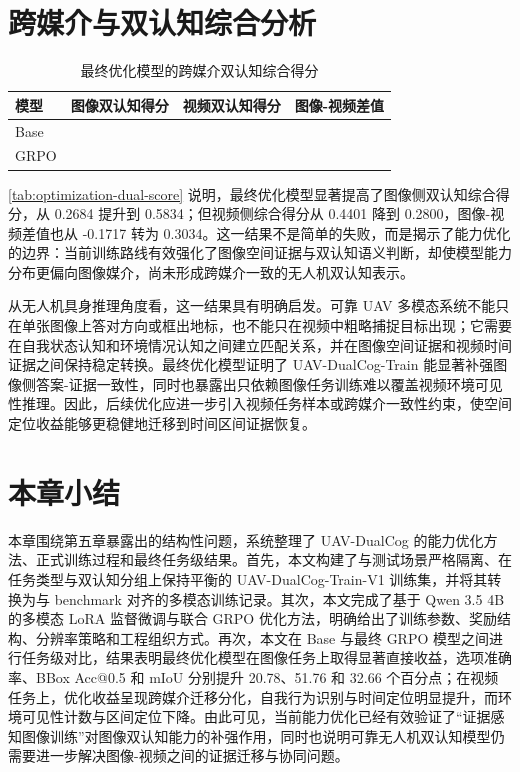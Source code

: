 \section{跨媒介与双认知综合分析}

\begin{table}[htbp]
    \centering
    \caption{最终优化模型的跨媒介双认知综合得分}
    \label{tab:optimization-dual-score}
    \small
    \begin{tabularx}{0.78\textwidth}{@{}X>{\centering\arraybackslash}p{2.3cm}>{\centering\arraybackslash}p{2.3cm}>{\centering\arraybackslash}p{2.3cm}@{}}
        \toprule
        模型 & 图像双认知得分 & 视频双认知得分 & 图像-视频差值 \\
        \midrule
        Base & 0.2684 & 0.4401 & -0.1717 \\
        GRPO & 0.5834 & 0.2800 & 0.3034 \\
        \bottomrule
    \end{tabularx}
\end{table}

\autoref{tab:optimization-dual-score} 说明，最终优化模型显著提高了图像侧双认知综合得分，从 0.2684 提升到 0.5834；但视频侧综合得分从 0.4401 降到 0.2800，图像-视频差值也从 -0.1717 转为 0.3034。这一结果不是简单的失败，而是揭示了能力优化的边界：当前训练路线有效强化了图像空间证据与双认知语义判断，却使模型能力分布更偏向图像媒介，尚未形成跨媒介一致的无人机双认知表示。

从无人机具身推理角度看，这一结果具有明确启发。可靠 UAV 多模态系统不能只在单张图像上答对方向或框出地标，也不能只在视频中粗略捕捉目标出现；它需要在自我状态认知和环境情况认知之间建立匹配关系，并在图像空间证据和视频时间证据之间保持稳定转换。最终优化模型证明了 UAV-DualCog-Train 能显著补强图像侧答案-证据一致性，同时也暴露出只依赖图像任务训练难以覆盖视频环境可见性推理。因此，后续优化应进一步引入视频任务样本或跨媒介一致性约束，使空间定位收益能够更稳健地迁移到时间区间证据恢复。

\section{本章小结}

本章围绕第五章暴露出的结构性问题，系统整理了 UAV-DualCog 的能力优化方法、正式训练过程和最终任务级结果。首先，本文构建了与测试场景严格隔离、在任务类型与双认知分组上保持平衡的 UAV-DualCog-Train-V1 训练集，并将其转换为与 benchmark 对齐的多模态训练记录。其次，本文完成了基于 Qwen 3.5 4B 的多模态 LoRA 监督微调与联合 GRPO 优化方法，明确给出了训练参数、奖励结构、分辨率策略和工程组织方式。再次，本文在 Base 与最终 GRPO 模型之间进行任务级对比，结果表明最终优化模型在图像任务上取得显著直接收益，选项准确率、BBox Acc@0.5 和 mIoU 分别提升 20.78、51.76 和 32.66 个百分点；在视频任务上，优化收益呈现跨媒介迁移分化，自我行为识别与时间定位明显提升，而环境可见性计数与区间定位下降。由此可见，当前能力优化已经有效验证了“证据感知图像训练”对图像双认知能力的补强作用，同时也说明可靠无人机双认知模型仍需要进一步解决图像-视频之间的证据迁移与协同问题。
